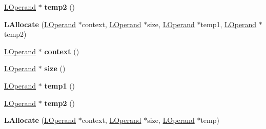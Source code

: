 \begin{DoxyCompactItemize}
\item 
\hyperlink{classv8_1_1internal_1_1_l_operand}{L\+Operand} $\ast$ {\bfseries temp2} ()\hypertarget{classv8_1_1internal_1_1_l_allocate_ac6d5be0b7ea0bdf9554a0a6921c3a70d}{}\label{classv8_1_1internal_1_1_l_allocate_ac6d5be0b7ea0bdf9554a0a6921c3a70d}

\item 
{\bfseries L\+Allocate} (\hyperlink{classv8_1_1internal_1_1_l_operand}{L\+Operand} $\ast$context, \hyperlink{classv8_1_1internal_1_1_l_operand}{L\+Operand} $\ast$size, \hyperlink{classv8_1_1internal_1_1_l_operand}{L\+Operand} $\ast$temp1, \hyperlink{classv8_1_1internal_1_1_l_operand}{L\+Operand} $\ast$temp2)\hypertarget{classv8_1_1internal_1_1_l_allocate_a45d86b0f120cf9be52d2bbd0494683af}{}\label{classv8_1_1internal_1_1_l_allocate_a45d86b0f120cf9be52d2bbd0494683af}

\item 
\hyperlink{classv8_1_1internal_1_1_l_operand}{L\+Operand} $\ast$ {\bfseries context} ()\hypertarget{classv8_1_1internal_1_1_l_allocate_a8e8d6f1d4913d84b1ecf49b67200b7a5}{}\label{classv8_1_1internal_1_1_l_allocate_a8e8d6f1d4913d84b1ecf49b67200b7a5}

\item 
\hyperlink{classv8_1_1internal_1_1_l_operand}{L\+Operand} $\ast$ {\bfseries size} ()\hypertarget{classv8_1_1internal_1_1_l_allocate_a39b42c01160d1f69ebea869bc4b92efe}{}\label{classv8_1_1internal_1_1_l_allocate_a39b42c01160d1f69ebea869bc4b92efe}

\item 
\hyperlink{classv8_1_1internal_1_1_l_operand}{L\+Operand} $\ast$ {\bfseries temp1} ()\hypertarget{classv8_1_1internal_1_1_l_allocate_a61237f94d30caf1437601ac509815068}{}\label{classv8_1_1internal_1_1_l_allocate_a61237f94d30caf1437601ac509815068}

\item 
\hyperlink{classv8_1_1internal_1_1_l_operand}{L\+Operand} $\ast$ {\bfseries temp2} ()\hypertarget{classv8_1_1internal_1_1_l_allocate_ac6d5be0b7ea0bdf9554a0a6921c3a70d}{}\label{classv8_1_1internal_1_1_l_allocate_ac6d5be0b7ea0bdf9554a0a6921c3a70d}

\item 
{\bfseries L\+Allocate} (\hyperlink{classv8_1_1internal_1_1_l_operand}{L\+Operand} $\ast$context, \hyperlink{classv8_1_1internal_1_1_l_operand}{L\+Operand} $\ast$size, \hyperlink{classv8_1_1internal_1_1_l_operand}{L\+Operand} $\ast$temp)\hypertarget{classv8_1_1internal_1_1_l_allocate_a209c4f2b3724dbd7d16031c72c35931b}{}\label{classv8_1_1internal_1_1_l_allocate_a209c4f2b3724dbd7d16031c72c35931b}


\end{DoxyCompactItemize}
